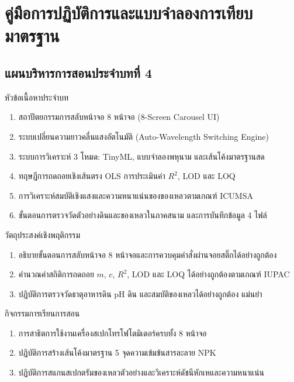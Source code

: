 \chapter{คู่มือการปฏิบัติการและแบบจำลองการเทียบมาตรฐาน}
\label{chap:ch04}

\section*{แผนบริหารการสอนประจำบทที่ 4}

\begin{planbox}{หัวข้อเนื้อหาประจำบท}
\begin{enumerate}[leftmargin=1.5em, itemsep=1pt]
    \item สถาปัตยกรรมการสลับหน้าจอ 8 หน้าจอ (8-Screen Carousel UI)
    \item ระบบเปลี่ยนความยาวคลื่นแสงอัตโนมัติ (Auto-Wavelength Switching Engine)
    \item ระบบการวิเคราะห์ 3 โหมด: TinyML, แบบจำลองพหุนาม และเส้นโค้งมาตรฐานสด
    \item ทฤษฎีการถดถอยเชิงเส้นตรง OLS การประเมินค่า $R^2$, LOD และ LOQ
    \item การวิเคราะห์สมบัติเชิงแสงและความหนาแน่นของของเหลวตามเกณฑ์ ICUMSA
    \item ขั้นตอนการตรวจวัดตัวอย่างดินและของเหลวในภาคสนาม และการบันทึกข้อมูล 4 ไฟล์
\end{enumerate}
\end{planbox}

\begin{planbox}{วัตถุประสงค์เชิงพฤติกรรม}
\begin{enumerate}[leftmargin=1.5em, itemsep=1pt]
    \item อธิบายขั้นตอนการสลับหน้าจอ 8 หน้าจอและการควบคุมคำสั่งผ่านจอยสติ๊กได้อย่างถูกต้อง
    \item คำนวณค่าสถิติการถดถอย $m$, $c$, $R^2$, LOD และ LOQ ได้อย่างถูกต้องตามเกณฑ์ IUPAC
    \item ปฏิบัติการตรวจวัดธาตุอาหารดิน pH ดิน และสมบัติของเหลวได้อย่างถูกต้อง แม่นยำ
\end{enumerate}
\end{planbox}

\begin{planbox}{กิจกรรมการเรียนการสอน}
\begin{enumerate}[leftmargin=1.5em, itemsep=1pt]
    \item การสาธิตการใช้งานเครื่องสเปกโทรโฟโตมิเตอร์ครบทั้ง 8 หน้าจอ
    \item ปฏิบัติการสร้างเส้นโค้งมาตรฐาน 5 จุดความเข้มข้นสารละลาย NPK
    \item ปฏิบัติการสแกนสเปกตรัมของเหลวตัวอย่างและวิเคราะห์ดัชนีหักเหและความหนาแน่น
\end{enumerate}
\end{planbox}

